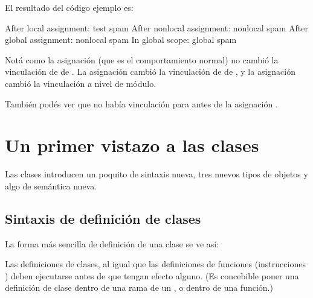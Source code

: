 \documentclass[a5paper,10pt,spanish]{sphinxmanual}
\begin{document}
\sphinxAtStartPar
El resultado del código ejemplo es:

\begin{sphinxVerbatim}[commandchars=\\\{\}]
After local assignment: test spam
After nonlocal assignment: nonlocal spam
After global assignment: nonlocal spam
In global scope: global spam
\end{sphinxVerbatim}

\sphinxAtStartPar
Notá como la asignación  (que es el comportamiento normal) no cambió la vinculación de  de .  La asignación  cambió la vinculación de  de , y la asignación  cambió la vinculación a nivel de módulo.

\sphinxAtStartPar
También podés ver que no había vinculación para  antes de la asignación .


\section{Un primer vistazo a las clases}
\label{\detokenize{tutorial/classes:a-first-look-at-classes}}\label{\detokenize{tutorial/classes:tut-firstclasses}}
\sphinxAtStartPar
Las clases introducen un poquito de sintaxis nueva, tres nuevos tipos de objetos y algo de semántica nueva.


\subsection{Sintaxis de definición de clases}
\label{\detokenize{tutorial/classes:class-definition-syntax}}\label{\detokenize{tutorial/classes:tut-classdefinition}}
\sphinxAtStartPar
La forma más sencilla de definición de una clase se ve así:

\begin{sphinxVerbatim}[commandchars=\\\{\}]
 
\end{sphinxVerbatim}

\sphinxAtStartPar
Las definiciones de clases, al igual que las definiciones de funciones (instrucciones ) deben ejecutarse antes de que tengan efecto alguno.  (Es concebible poner una definición de clase dentro de una rama de un , o dentro de una función.)
\end{document}
